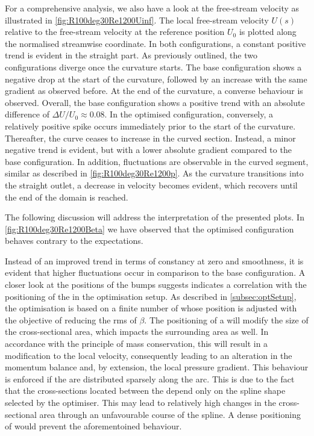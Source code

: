 For a comprehensive analysis, we also have a look at the free-stream velocity as illustrated in \autoref{fig:R100deg30Re1200Uinf}.
The local free-stream velocity $U(s)$ relative to the free-stream velocity at the reference position $U_0$ is plotted along the normalised streamwise coordinate.
In both configurations, a constant positive trend is evident in the straight part.
As previously outlined, the two configurations diverge once the curvature starts.
The base configuration shows a negative drop at the start of the curvature, followed by an increase with the same gradient as observed before.
At the end of the curvature, a converse behaviour is observed.
Overall, the base configuration shows a positive trend with an absolute difference of $\Delta U/U_0 \approx 0.08$.
In the optimised configuration, conversely, a relatively positive spike occurs immediately prior to the start of the curvature.
Thereafter, the curve ceases to increase in the curved section. 
Instead, a minor negative trend is evident, but with a lower absolute gradient compared to the base configuration.
In addition, fluctuations are observable in the curved segment, similar as described in \autoref{fig:R100deg30Re1200p}.
As the curvature transitions into the straight outlet, a decrease in velocity becomes evident, which recovers until the end of the domain is reached.


The following discussion will address the interpretation of the presented plots. 
In \autoref{fig:R100deg30Re1200Beta} we have observed that the optimised configuration behaves contrary to the expectations.


Instead of an improved trend in terms of constancy at zero and smoothness, it is evident that higher fluctuations occur in comparison to the base configuration.
A closer look at the positions of the bumps suggests indicates a correlation with the positioning of the  in the optimisation setup.
As described in \autoref{subsec:optSetup}, the optimisation is based on a finite number of  whose position is adjusted with the objective of reducing the \acrfull{rms} of $\beta$.
The positioning of a  will modify the size of the cross-sectional area, which impacts the surrounding area as well.
In accordance with the principle of mass conservation, this will result in a modification to the local velocity, consequently leading to an alteration in the momentum balance and, by extension, the local pressure gradient.
This behaviour is enforced if the  are distributed sparsely along the arc.
This is due to the fact that the cross-sections located between the  depend only on the spline shape selected by the optimiser.
This may lead to relatively high changes in the cross-sectional area through an unfavourable course of the spline.
A dense positioning of  would prevent the aforementoined behaviour.



